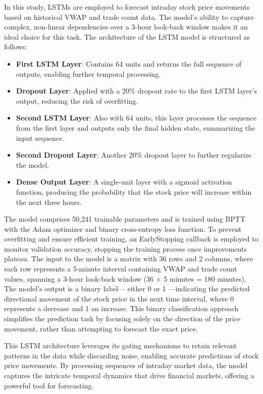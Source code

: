 \documentclass[10pt,a4paper]{article}
\begin{document}
In this study, LSTMs are employed to forecast intraday stock price movements based on historical VWAP and trade count data. The model’s ability to capture complex, non-linear dependencies over a 3-hour look-back window makes it an ideal choice for this task. The architecture of the LSTM model is structured as follows:


\begin{itemize}
    \item \textbf{First LSTM Layer}: Contains 64 units and returns the full sequence of outputs, enabling further temporal processing.
    \item \textbf{Dropout Layer}: Applied with a 20\% dropout rate to the first LSTM layer’s output, reducing the risk of overfitting.
    \item \textbf{Second LSTM Layer}: Also with 64 units, this layer processes the sequence from the first layer and outputs only the final hidden state, summarizing the input sequence.
    \item \textbf{Second Dropout Layer}: Another 20\% dropout layer to further regularize the model.
    \item \textbf{Dense Output Layer}: A single-unit layer with a sigmoid activation function, producing the probability that the stock price will increase within the next three hours.
\end{itemize}

The model comprises 50,241 trainable parameters and is trained using BPTT with the Adam optimizer and binary cross-entropy loss function. To prevent overfitting and ensure efficient training, an EarlyStopping callback is employed to monitor validation accuracy, stopping the training process once improvements plateau. The input to the model is a matrix with 36 rows and 2 columns, where each row represents a 5-minute interval containing VWAP and trade count values, spanning a 3-hour look-back window (36 \(\times\) 5 minutes = 180 minutes). The model’s output is a binary label— either 0 or 1 —indicating the predicted directional movement of the stock price in the next time interval, where 0 represents a decrease and 1 an increase. This binary classification approach simplifies the prediction task by focusing solely on the direction of the price movement, rather than attempting to forecast the exact price. %

This LSTM architecture leverages its gating mechanisms to retain relevant patterns in the data while discarding noise, enabling accurate predictions of stock price movements. By processing sequences of intraday market data, the model captures the intricate temporal dynamics that drive financial markets, offering a powerful tool for forecasting.
\end{document}
